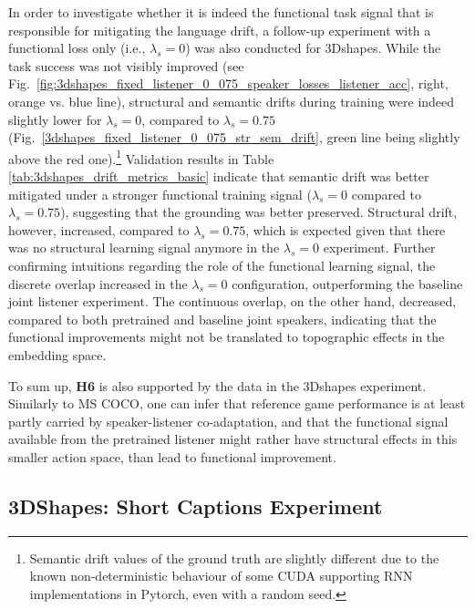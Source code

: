 In order to investigate whether it is indeed the functional task signal that is responsible for mitigating the language drift, a follow-up experiment with a functional loss only (i.e., $\lambda_s=0$) was also conducted for 3Dshapes. While the task success was not visibly improved (see Fig.~\ref{fig:3dshapes_fixed_listener_0_075_speaker_losses_listener_acc}, right, orange vs. blue line), structural and semantic drifts during training were indeed slightly lower for $\lambda_s=0$, compared to $\lambda_s=0.75$ (Fig.~\ref{3dshapes_fixed_listener_0_075_str_sem_drift}, green line being slightly above the red one).\footnote{Semantic drift values of the ground truth are slightly different due to the known non-deterministic behaviour of some CUDA supporting RNN implementations in Pytorch, even with a random seed.} Validation results in Table \ref{tab:3dshapes_drift_metrics_basic} indicate that semantic drift was better mitigated under a stronger functional training signal ($\lambda_s =0$ compared to $\lambda_s =0.75$), suggesting that the grounding was better preserved. Structural drift, however, increased, compared to $\lambda_s =0.75$, which is expected given that there was no structural learning signal anymore in the $\lambda_s =0$ experiment. Further confirming intuitions regarding the role of the functional learning signal, the discrete overlap increased in the $\lambda_s =0$ configuration, outperforming the baseline joint listener experiment. The continuous overlap, on the other hand, decreased, compared to both pretrained and baseline joint speakers, indicating that the functional improvements might not be translated to topographic effects in the embedding space.  

To sum up, \textbf{H6} is also supported by the data in the 3Dshapes experiment. Similarly to MS COCO, one can infer that reference game performance is at least partly carried by speaker-listener co-adaptation, and that the functional signal available from the pretrained listener might rather have structural effects in this smaller action space, than lead to functional improvement.   

\subsection{3DShapes: Short Captions Experiment}
\label{expt:3dshapes_short}

